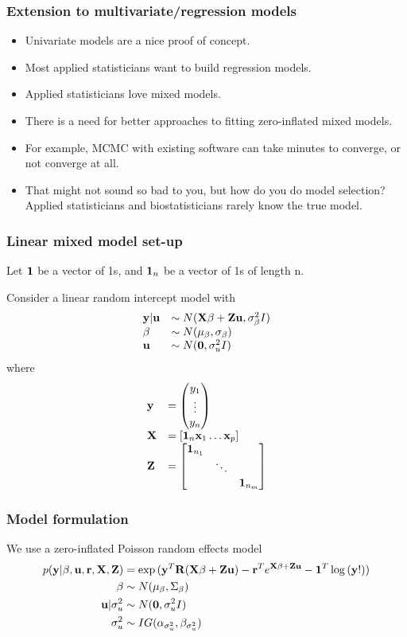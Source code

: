 \documentclass{beamer}
\begin{document}
\begin{frame}
\frametitle{Extension to multivariate/regression models}
\begin{itemize}
\item Univariate models are a nice proof of concept.
\item Most applied statisticians want to build regression models.
\item Applied statisticians love mixed models.
\item There is a need for better approaches to fitting zero-inflated mixed models.
\item For example, MCMC with existing software can take minutes to
converge, or not converge at all.
\item That might not sound so bad to you, but how do you
do model selection? Applied statisticians and biostatisticians rarely know the true model.
\end{itemize}
\end{frame}

\begin{frame}
\frametitle{Linear mixed model set-up}
Let ${\bf 1}$ be a vector of 1s, and ${\bf 1}_n$ be a vector of 1s of
length n.

Consider a linear random intercept model with
$$
\begin{array}{ll}
{\bf y}|{\bf u} &\sim N({\bf X} {\bf \beta} + {\bf Z} {\bf u}, \sigma_{\bf \beta}^2 I) \\
{\bf \beta} &\sim N({\bf \mu}_{\bf \beta}, \sigma_{\bf \beta}) \\
{\bf u} &\sim N({\bf 0}, \sigma_u^2 I)
\end{array}
$$
\noindent where
$$
\begin{array}{ll}
{\bf y} & =
\begin{pmatrix}
y_1 \\
\vdots \\
y_n
\end{pmatrix} \\
{\bf X} &= [{\bf 1}_n {\bf x}_1 \hdots {\bf x}_p] \\
{\bf Z} &=
\begin{bmatrix}
{\bf 1}_{n_1} &  & \\
& \ddots & \\
& & {\bf 1}_{n_m}
\end{bmatrix}
\end{array}
$$
\end{frame}

\begin{frame}
\frametitle{Model formulation}
We use a zero-inflated Poisson random effects model
\begin{align*}
p({\bf y}|{\bf \beta}, {\bf u}, {\bf r}, {\bf X}, {\bf Z}) &= \exp{({\bf y}^T{\bf R}({\bf X}{\bf \beta}+ {\bf Z}{\bf u}) - {\bf r}^Te^{{\bf X}{\bf \beta}+ {\bf Z}{\bf u}} - {\bf 1}^T\log{({\bf y}!)})} \\
{\bf \beta} &\sim N({\bf \mu}_{\bf \beta}, \Sigma_{\bf \beta}) \\
{\bf u}|\sigma_u^2 &\sim N({\bf 0}, \sigma_u^2 I) \\
\sigma_u^2 &\sim IG(\alpha_{\sigma_u^2}, \beta_{\sigma_u^2}) \\
\end{align*}
\end{frame}
\end{document}
